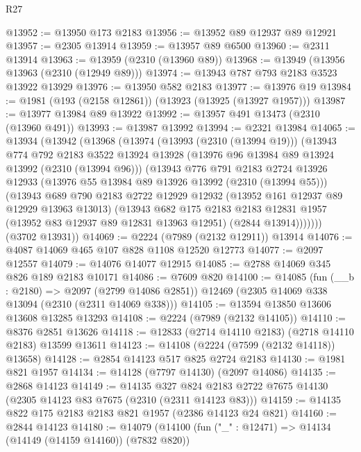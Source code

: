 \begin{lexlean}{R27}
\begin{coremodule}
@13952 := @13950 @173 @2183
@13956 := @13952 @89 @12937 @89 @12921
@13957 := @2305 @13914
@13959 := @13957 @89 @6500
@13960 := @2311 @13914
@13963 := @13959 (@2310 (@13960 @89))
@13968 := @13949 (@13956 @13963 (@2310 (@12949 @89)))
@13974 := @13943 @787 @793 @2183 @3523 @13922 @13929
@13976 := @13950 @582 @2183
@13977 := @13976 @19
@13984 := @1981 (@193 (@2158 @12861)) (@13923 (@13925 (@13927 @1957)))
@13987 := @13977 @13984 @89 @13922
@13992 := @13957 @491 @13473 (@2310 (@13960 @491))
@13993 := @13987 @13992
@13994 := @2321 @13984
@14065 := @13934
    (@13942
      (@13968
        (@13974
          (@13993 (@2310 (@13994 @19)))
          (@13943
            @774
            @792
            @2183
            @3522
            @13924
            @13928
            (@13976 @96 @13984 @89 @13924 @13992 (@2310 (@13994 @96)))
            (@13943
              @776
              @791
              @2183
              @2724
              @13926
              @12933
              (@13976 @55 @13984 @89 @13926 @13992 (@2310 (@13994 @55)))
              (@13943
                @689
                @790
                @2183
                @2722
                @12929
                @12932
                (@13952 @161 @12937 @89 @12929 @13963 @13013)
                (@13943
                  @682
                  @175
                  @2183
                  @2183
                  @12831
                  @1957
                  (@13952 @83 @12937 @89 @12831 @13963 @12951)
                  (@2844 @13914)))))))
      (@3702 @13931))
@14069 := @2224 (@7989 (@2132 @12911)) @13914
@14076 := @4087 @14069 @465 @107 @828 @1108 @12520 @12773
@14077 := @2097 @12557
@14079 := @14076 @14077 @12915
@14085 := @2788 @14069 @345 @826 @189 @2183 @10171
@14086 := @7609 @820
@14100 := @14085
    (fun (__b : @2180) => @2097 (@2799 @14086 @2851))
    @12469
    (@2305 @14069 @338 @13094 (@2310 (@2311 @14069 @338)))
@14105 := @13594 @13850 @13606 @13608 @13285 @13293
@14108 := @2224 (@7989 (@2132 @14105))
@14110 := @8376 @2851 @13626
@14118 := @12833 (@2714 @14110 @2183) (@2718 @14110 @2183) @13599 @13611
@14123 := @14108 (@2224 (@7599 (@2132 @14118)) @13658)
@14128 := @2854 @14123 @517 @825 @2724 @2183
@14130 := @1981 @821 @1957
@14134 := @14128 (@7797 @14130) (@2097 @14086)
@14135 := @2868 @14123
@14149 := @14135
    @327
    @824
    @2183
    @2722
    @7675
    @14130
    (@2305 @14123 @83 @7675 (@2310 (@2311 @14123 @83)))
@14159 := @14135 @822 @175 @2183 @2183 @821 @1957 (@2386 @14123 @24 @821)
@14160 := @2844 @14123
@14180 := @14079
    (@14100
      (fun ("_" : @12471) => @14134 (@14149 (@14159 @14160)) (@7832 @820))

\end{coremodule}
\end{lexlean}
